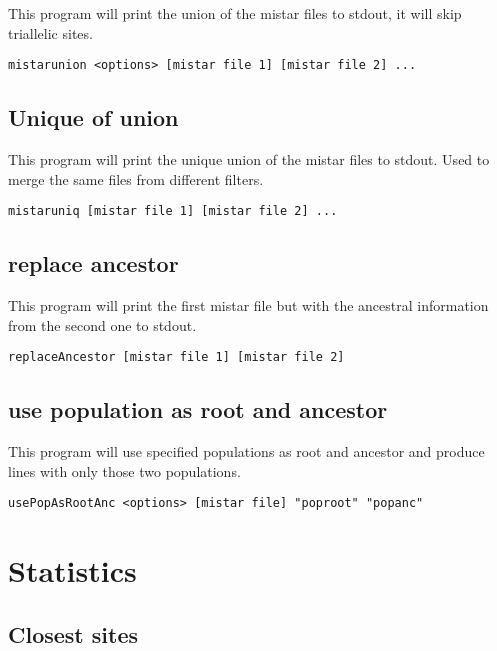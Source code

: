 \documentclass[a4paper]{article}
\begin{document}
This program will print the union of the mistar files to stdout, it will skip triallelic sites.

\begin{verbatim}
mistarunion <options> [mistar file 1] [mistar file 2] ...
\end{verbatim}


\subsection{Unique of union}

This program will print the unique union of the mistar files to stdout. Used to merge the same files from different filters.

\begin{verbatim}
mistaruniq [mistar file 1] [mistar file 2] ...
\end{verbatim}


\subsection{replace ancestor}

This program will print the first mistar file but with the ancestral information from the second one to stdout.

\begin{verbatim}
replaceAncestor [mistar file 1] [mistar file 2]
\end{verbatim}


\subsection{use population as root and ancestor}

This program will use specified populations as root and ancestor and produce lines with only those two populations.

\begin{verbatim}
usePopAsRootAnc <options> [mistar file] "poproot" "popanc"
\end{verbatim}



\section{Statistics}

\subsection{Closest sites}
\end{document}
